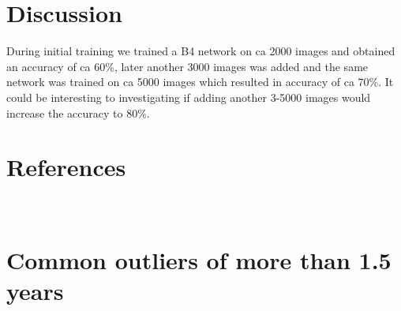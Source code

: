 \documentclass[10pt,letterpaper]{article}
\begin{document}
\section*{Discussion}

During initial training we trained a B4 network on ca 2000 images and obtained
an accuracy of ca 60\%, later another 3000 images was added and the same
network was trained on ca 5000 images which resulted in accuracy of ca 70\%.
It could be interesting to investigating if adding another 3-5000 images
would increase the accuracy to 80\%.


\section*{References}




\appendix
\section{\\Common outliers of more than 1.5 years}
\end{document}
